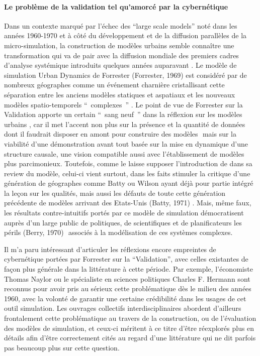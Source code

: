 \paragraph*{Le problème de la validation tel qu’amorcé par la cybernétique}

Dans un contexte marqué par l'échec des \foreignquote{english}{large scale models} noté dans les années 1960-1970 \autocite{Lee1973} et à côté du développement et de la diffusion parallèles de la micro-simulation, la construction de modèles urbains semble connaître une transformation qui va de pair avec la diffusion mondiale des premiers cadres d'analyse systémique introduits quelques années auparavant \autocites{Ackerman1963, Harvey1969, Berry1964a, Chorley1962, Haggett1965}⁠. Le modèle de simulation Urban Dynamics de Forrester (Forrester, 1969)⁠%
est considéré par de nombreux géographes comme un événement charnière cristallisant cette séparation entre les anciens modèles statiques et aspatiaux et les nouveaux modèles spatio-temporels \enquote{ complexes } \autocites{Batty1976, Batty2005}. Le point de vue de Forrester sur la Validation apporte un certain \enquote{ sang neuf } dans la réflexion sur les modèles urbains \autocite{Lee1973}⁠, car il met l'accent non plus sur la présence et la quantité de données dont il faudrait disposer en amont pour construire des modèles \autocite[355]{Batty1976}⁠ mais sur la viabilité d'une démonstration avant tout basée sur la mise en dynamique d'une structure causale, une vision compatible aussi avec l'établissement de modèles plus parcimonieux. Toutefois, comme le laisse supposer l'introduction de \textcite{Tobler1970a}  dans sa review du modèle, celui-ci vient surtout, dans les faits stimuler la critique d'une génération de géographes comme Batty ou Wilson ayant déjà pour partie intégré la leçon sur les qualités, mais aussi les défauts de toute cette génération précédente de modèles arrivant des Etats-Unis (Batty, 1971)⁠%
. Mais, même faux, les résultats contre-intuitifs portés par ce modèle de simulation démocratisent auprès d'un large public de politiques, de scientifiques et de planificateurs les périls (Berry, 1970)%
⁠ associés à la modélisation de ces systèmes complexes.

Il m'a paru intéressant d'articuler les réflexions encore empreintes de cybernétique portées par Forrester sur la \enquote{Validation}, avec celles existantes de façon plus générale dans la littérature à cette période. Par exemple, l'économiste Thomas Naylor ou le spécialiste en sciences politiques Charles F. Hermann \autocites{Naylor1966,Naylor1967, Naylor1969, Hermann1967} sont reconnus \autocites{Nance2002, Balci1986} ⁠pour avoir pris au sérieux cette problématique dès le milieu des années 1960, avec la volonté de garantir une certaine crédibilité dans les usages de cet outil simulation. Les ouvrages collectifs interdisciplinaires \autocites{Guetzkow1972, Dutton1971}  abordent d'ailleurs frontalement cette problématique au travers de la construction, ou de l'évaluation des modèles de simulation, et ceux-ci méritent à ce titre d'être réexplorés plus en détails afin d'être correctement cités au regard d'une littérature qui ne dit parfois pas beaucoup plus sur cette question. 

